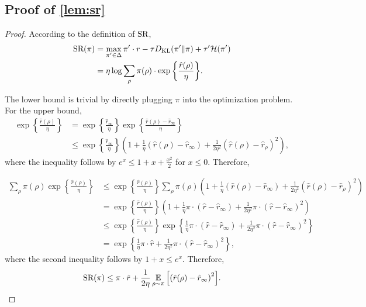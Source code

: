 \subsection{Proof of \cref{lem:sr}}
\begin{proof}
According to the definition of $\text{SR}$,
\begin{align*}
	\text{SR}(\pi) &= \max_{\pi' \in \Delta}{  \pi' \cdot r - \tau D_{\mathrm{KL}}(\pi' \Vert \pi) + \tau' \mathcal{H}(\pi') } \\
	&= \eta \log \sum\limits_{\rho}{ \pi(\rho) \cdot \exp \left\{ \frac{\hat{r}(\rho)}{\eta}\right\} }.
\end{align*}

The lower bound is trivial by directly plugging $\pi$ into the optimization problem. For the upper bound,
\begin{align*}
	\exp \left\{ \frac{\hat{r}(\rho)}{\eta} \right\} &= \exp \left\{ \frac{\hat{r}_\infty}{\eta} \right\} \exp\left\{ \frac{\hat{r}(\rho) - \hat{r}_\infty }{\eta}\right\} \\
	&\leq \exp \left\{ \frac{\hat{r}_\infty}{\eta} \right\} \left( 1 + \frac{1}{\eta} \left( \hat{r}(\rho) - \hat{r}_\infty \right) + \frac{1}{2\eta^2} \left(\hat{r}(\rho) - \hat{r}_\rho \right)^2\right),
\end{align*}
where the inequality follows by $e^x \leq 1+x+ \frac{x^2}{2}$ for $x\leq 0$. Therefore,

\begin{align*}
	\sum\limits_{\rho} \pi(\rho) \exp\left\{ \frac{\hat{r}(\rho)}{\eta}\right\} &\leq \exp\left\{\frac{\hat{r}(\rho)}{\eta}\right\}  \sum_\rho \pi(\rho) \left( 1 + \frac{1}{\eta} \left( \hat{r}(\rho) - \hat{r}_\infty \right) + \frac{1}{2\eta^2} \left(\hat{r}(\rho) - \hat{r}_\rho \right)^2\right) \\
	&=  \exp\left\{ \frac{\hat{r}(\rho)}{\eta}\right\} \left( 1 + \frac{1}{\eta} \pi \cdot\left( \hat{r}-\hat{r}_\infty \right) + \frac{1}{2\eta^2} \pi\cdot \left(  \hat{r} - \hat{r}_\infty \right)^2 \right) \\
	&\leq \exp\left\{ \frac{\hat{r}(\rho)}{\eta}\right\} \exp \left\{ \frac{1}{\eta} \pi \cdot\left( \hat{r}-\hat{r}_\infty \right) + \frac{1}{2\eta^2} \pi\cdot \left(  \hat{r} - \hat{r}_\infty \right)^2 \right\} \\
	&= \exp \left\{ \frac{1}{\eta} \pi\cdot \hat{r} + \frac{1}{2\eta^2} \pi\cdot \left( \hat{r} - \hat{r}_\infty \right)^2 \right\},
\end{align*}
where the second inequality follows by $1+x \leq e^x$. Therefore,
\begin{align*}
\text{SR}(\pi) \leq \pi\cdot \hat{r} + \frac{1}{2\eta} \operatorname*{\mathbb{E}}_{\rho\sim \pi}{\left[\left( \hat{r}(\rho) - \hat{r}_\infty \right)^2 \right]}.
\end{align*}


\end{proof}
